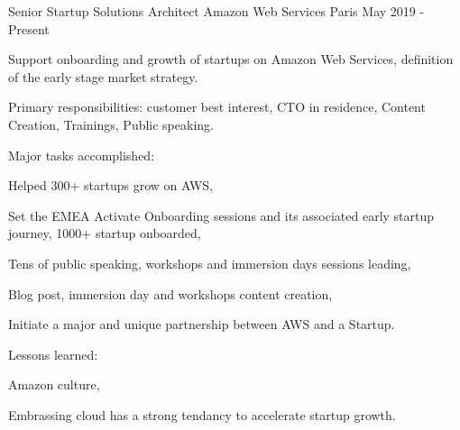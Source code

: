

\begin{cventries}

  \cventry
    {Senior Startup Solutions Architect} %
    {Amazon Web Services} %
    {Paris} %
    {May 2019 - Present} %
    {
      \begin{cvitems} %
        \item {Support onboarding and growth of startups on Amazon Web Services, definition of the early stage market strategy.}
        \item {Primary responsibilities: customer best interest, CTO in residence, Content Creation, Trainings, Public speaking.}
        \item {Major tasks accomplished:}
        \begin{cvsubitems}
          \item {Helped 300+ startups grow on AWS,}
          \item {Set the EMEA Activate Onboarding sessions and its associated early startup journey, 1000+ startup onboarded,}
          \item {Tens of public speaking, workshops and immersion days sessions leading,}
          \item {Blog post, immersion day and workshops content creation,}
          \item {Initiate a major and unique partnership between AWS and a Startup.}
        \end{cvsubitems}
        \item {Lessons learned:}
        \begin{cvsubitems}
          \item {Amazon culture,}
          \item {Embrassing cloud has a strong tendancy to accelerate startup growth.}
        \end{cvsubitems}
      \end{cvitems}
    }


\end{cventries}
